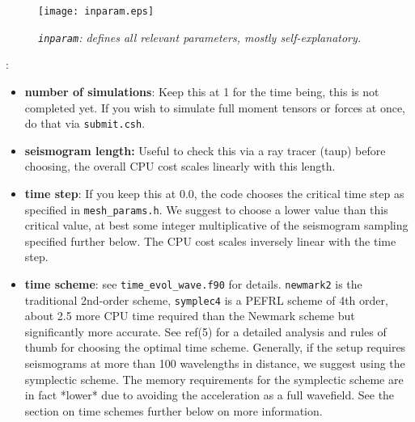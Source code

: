\documentclass[11pt,letter,fleqn,english,notitlepage]{article}
\begin{document}
\begin{figure*}[htb]
\begin{center}
\texttt{[image: inparam.eps]}
\caption{\textit{{\tt inparam}: defines all relevant parameters, mostly self-explanatory. }}
\end{center}
\end{figure*}
%
:
\begin{itemize}
\item \textbf{number of simulations}: Keep this at 1 for the time being, this is not completed yet. 
If you wish to simulate full moment tensors or forces at once, do that via {\tt submit.csh}.
\item \textbf{seismogram length:} Useful to check this via a ray tracer (taup) before choosing, the overall 
CPU cost scales linearly with this length.
\item \textbf{time step}: If you keep this at 0.0, the code chooses the critical time step as specified in
{\tt mesh\_params.h}.
We suggest to choose a lower value than this critical value, at best some  
integer multiplicative of the seismogram sampling specified further below. The CPU cost 
scales inversely linear with the time step.
\item \textbf{time scheme}: see {\tt time\_evol\_wave.f90} for details. 
{\tt newmark2} is the traditional 2nd-order 
scheme, {\tt symplec4} is a PEFRL scheme of 4th order, about 2.5 more CPU time 
required than the Newmark scheme but significantly more accurate. See ref(5) for a
detailed analysis and rules of thumb for choosing the optimal time scheme. 
Generally, if the setup requires seismograms at more than 100 wavelengths 
in distance, we suggest using the symplectic scheme. The memory requirements 
for the symplectic scheme are in fact *lower* due to avoiding the acceleration
as a full wavefield. See the section on time schemes further below on more information.


\end{itemize}
\end{document}
